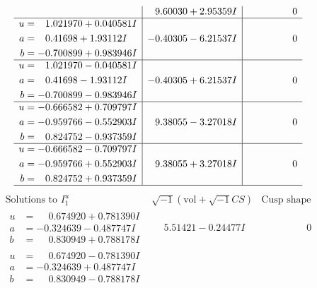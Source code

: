 \documentclass[1p]{elsarticle_modified}
\theoremstyle{definition}
\newcommand{\I}{\sqrt{-1}}
\begin{document}
$$\begin{array}{c|c|c}
 & \phantom{-}9.60030 + 2.95359 I & \phantom{-0.000000 } 0 \\ \hline\begin{aligned}
u &= \phantom{-}1.021970 + 0.040581 I \\
a &= \phantom{-}0.41698 + 1.93112 I \\
b &= -0.700899 + 0.983946 I\end{aligned}
 & -0.40305 - 6.21537 I & \phantom{-0.000000 } 0 \\ \hline\begin{aligned}
u &= \phantom{-}1.021970 - 0.040581 I \\
a &= \phantom{-}0.41698 - 1.93112 I \\
b &= -0.700899 - 0.983946 I\end{aligned}
 & -0.40305 + 6.21537 I & \phantom{-0.000000 } 0 \\ \hline\begin{aligned}
u &= -0.666582 + 0.709797 I \\
a &= -0.959766 - 0.552903 I \\
b &= \phantom{-}0.824752 - 0.937359 I\end{aligned}
 & \phantom{-}9.38055 - 3.27018 I & \phantom{-0.000000 } 0 \\ \hline\begin{aligned}
u &= -0.666582 - 0.709797 I \\
a &= -0.959766 + 0.552903 I \\
b &= \phantom{-}0.824752 + 0.937359 I\end{aligned}
 & \phantom{-}9.38055 + 3.27018 I & \phantom{-0.000000 } 0\\
 \hline 
 \end{array}$$\newpage$$\begin{array}{c|c|c}  
\text{Solutions to }I^u_{1}& \I (\text{vol} + \sqrt{-1}CS) & \text{Cusp shape}\\
 \hline 
\begin{aligned}
u &= \phantom{-}0.674920 + 0.781390 I \\
a &= -0.324639 - 0.487747 I \\
b &= \phantom{-}0.830949 + 0.788178 I\end{aligned}
 & \phantom{-}5.51421 - 0.24477 I & \phantom{-0.000000 } 0 \\ \hline\begin{aligned}
u &= \phantom{-}0.674920 - 0.781390 I \\
a &= -0.324639 + 0.487747 I \\
b &= \phantom{-}0.830949 - 0.788178 I\end{aligned}

\end{array}$$
\end{document}
